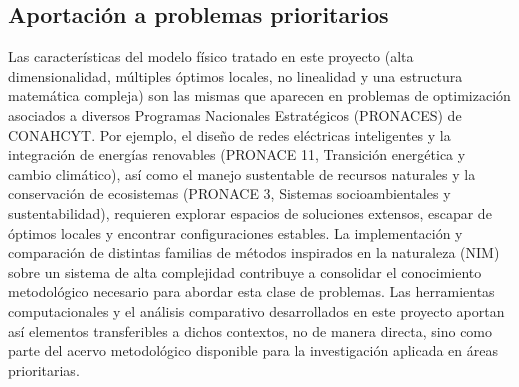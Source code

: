 \subsection{Aportación a problemas prioritarios}

Las características del modelo físico tratado en este proyecto
(alta dimensionalidad, múltiples óptimos locales, no
linealidad y una estructura matemática compleja) son las
mismas que aparecen en problemas de optimización asociados a
diversos Programas Nacionales Estratégicos (PRONACES) de
CONAHCYT. Por ejemplo, el diseño de redes eléctricas
inteligentes y la integración de energías renovables
(PRONACE 11, Transición energética y cambio climático), así
como el manejo sustentable de recursos naturales y la
conservación de ecosistemas (PRONACE 3, Sistemas
socioambientales y sustentabilidad), requieren explorar
espacios de soluciones extensos, escapar de óptimos locales y
encontrar configuraciones estables. La implementación y
comparación de distintas familias de métodos inspirados en la
naturaleza (NIM) sobre un sistema de alta complejidad
contribuye a consolidar el conocimiento metodológico necesario
para abordar esta clase de problemas. Las herramientas
computacionales y el análisis comparativo desarrollados en
este proyecto aportan así elementos transferibles a dichos
contextos, no de manera directa, sino como parte del acervo
metodológico disponible para la investigación aplicada en
áreas prioritarias.
